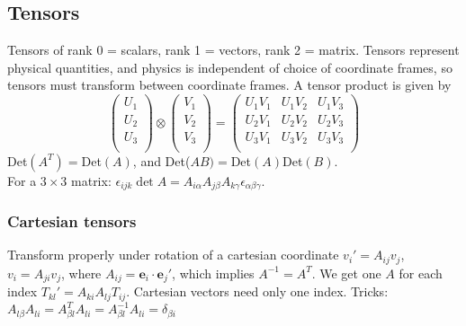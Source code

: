 \documentclass[a4paper, 10pt]{article}
\begin{document}
\begin{multicols*}{3}
\begin{mdframed}
\subsection*{Tensors}
\end{mdframed}
Tensors of rank 0 = scalars, rank 1 = vectors, rank 2 = matrix. Tensors represent physical quantities, and physics is independent of choice of coordinate frames, so tensors must transform between coordinate frames. A tensor product is given by
\[
\left(\begin{matrix}
U_1 \\ U_2 \\ U_3 \\
\end{matrix}\right)
\otimes
\left(\begin{matrix}
V_1 \\ V_2 \\ V_3 \\
\end{matrix}\right)
=
\left(\begin{matrix}
U_1V_1 & U_1V_2 & U_1V_3 \\
U_2V_1 & U_2V_2 & U_2V_3 \\
U_3V_1 & U_3V_2 & U_3V_3 \\
\end{matrix}\right)
\]
Det$(A^T)=$Det$(A)$, and Det($AB)=$Det$(A)$Det$(B)$.\\
For a $3\times 3$ matrix: $\epsilon_{ijk}\det{A} = A_{i\alpha}A_{j\beta}A_{k\gamma}\epsilon_{\alpha\beta\gamma}$.
\subsubsection*{Cartesian tensors}
Transform properly under rotation of a cartesian coordinate
$v_i' = A_{ij}v_j$, $v_i = A_{ji}v_j$, where $A_{ij} = \bm{e}_i\cdot \bm{e}_j'$, which implies $A^{-1} = A^{T}$. We get one $A$ for each index  $T_{kl}' = A_{ki}A_{lj}T_{ij}$. Cartesian vectors need only one index. Tricks:\\
$A_{l\beta}A_{li} = A_{\beta l}^TA_{li} = A_{\beta l}^{-1}A_{li} = \delta_{\beta i}$

\end{multicols*}
\end{document}
